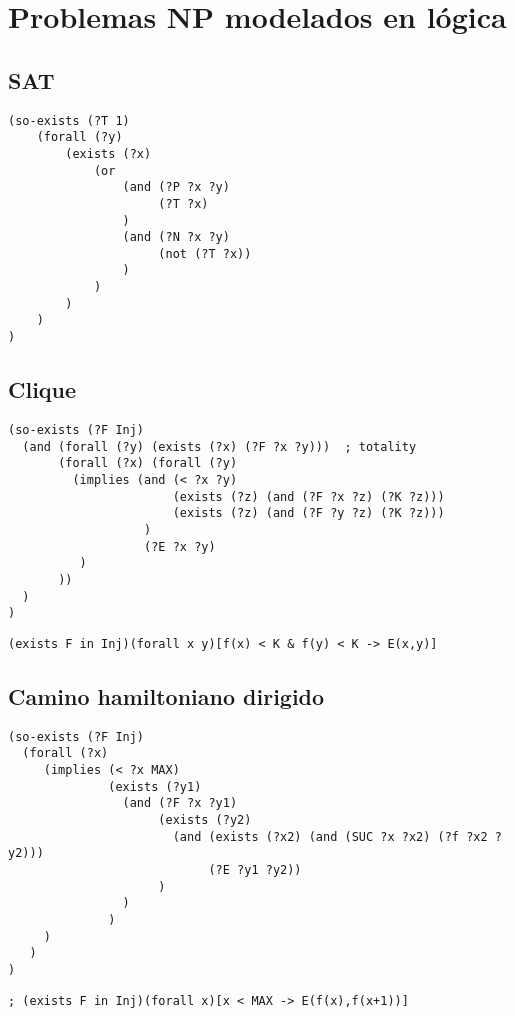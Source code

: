 
\chapter{Problemas NP modelados en lógica}
\label{apendiceA}

\section{SAT}
\begin{verbatim}
(so-exists (?T 1)
    (forall (?y)
        (exists (?x)
            (or
                (and (?P ?x ?y)
                     (?T ?x)
                )
                (and (?N ?x ?y)
                     (not (?T ?x))
                )
            )
        )
    )
)    
\end{verbatim}

\section{Clique}
\begin{verbatim}
(so-exists (?F Inj)
  (and (forall (?y) (exists (?x) (?F ?x ?y)))  ; totality
       (forall (?x) (forall (?y)
         (implies (and (< ?x ?y)
                       (exists (?z) (and (?F ?x ?z) (?K ?z)))
                       (exists (?z) (and (?F ?y ?z) (?K ?z)))
                   )
                   (?E ?x ?y)
          )
       ))
  )
)
\end{verbatim}

\begin{verbatim}
(exists F in Inj)(forall x y)[f(x) < K & f(y) < K -> E(x,y)]
\end{verbatim}

\section{Camino hamiltoniano dirigido}
\begin{verbatim}
(so-exists (?F Inj)
  (forall (?x)
     (implies (< ?x MAX)
              (exists (?y1)
                (and (?F ?x ?y1)
                     (exists (?y2)
                       (and (exists (?x2) (and (SUC ?x ?x2) (?f ?x2 ?y2)))
                            (?E ?y1 ?y2))
                     )
                )
              )
     )
   )
)
\end{verbatim}
\begin{verbatim}
; (exists F in Inj)(forall x)[x < MAX -> E(f(x),f(x+1))]
\end{verbatim}

